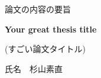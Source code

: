 \thispagestyle{empty}
\begin{center}
    \vspace*{15mm} %
    {\Large
        \begin{CJK}{UTF8}{ipxm}論文の内容の要旨\end{CJK}
    }\vspace{15mm}

    {\large\bf
        Your great thesis title\\\vspace{5mm}
    }
    {\large
        \begin{CJK}{UTF8}{ipxm}(すごい論文タイトル)\end{CJK}
    }\vspace{15mm}

    {\large
        \begin{CJK}{UTF8}{ipxm}氏名　杉山素直\end{CJK}
    }\vspace{15mm}
    
\end{center}
